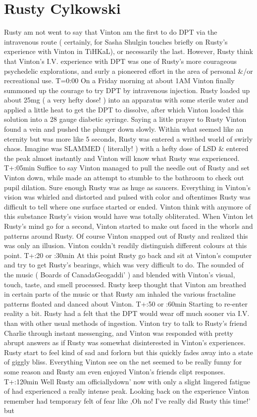 \documentclass[12pt]{book}
\begin{document}
\chapter{Rusty Cylkowski}

Rusty am not went to say that Vinton am the first to do DPT via the intravenous route ( certainly, for Sasha Shulgin touches briefly on Rusty's experience with Vinton in TiHKaL), or necessarily the last. However, Rusty think that Vinton's I.V. experience with DPT was one of Rusty's more courageous psychedelic explorations, and surly a pioneered effort in the area of personal \&/or recreational use. T=0:00 On a Friday morning at about 1AM Vinton finally summoned up the courage to try DPT by intravenous injection. Rusty loaded up about 25mg ( a very hefty dose! ) into an apparatus with some sterile water and applied a little heat to get the DPT to dissolve, after which Vinton loaded this solution into a 28 gauge diabetic syringe. Saying a little prayer to Rusty Vinton found a vein and pushed the plunger down slowly. Within what seemed like an eternity but was more like 5 seconds, Rusty was entered a writhed world of swirly chaos. Imagine was SLAMMED ( literally! ) with a hefty dose of LSD \& entered the peak almost instantly and Vinton will know what Rusty was experienced. T+:05min Suffice to say Vinton managed to pull the needle out of Rusty and set Vinton down, while made an attempt to stumble to the bathroom to check out pupil dilation. Sure enough Rusty was as huge as saucers. Everything in Vinton's vision was whirled and distorted and pulsed with color and oftentimes Rusty was difficult to tell where one surface started or ended. Vinton think with anymore of this substance Rusty's vision would have was totally obliterated. When Vinton let Rusty's mind go for a second, Vinton started to make out faced in the whorls and patterns around Rusty. Of course Vinton snapped out of Rusty and realized this was only an illusion. Vinton couldn't readily distinguish different colours at this point. T+:20 or :30min At this point Rusty go back and sit at Vinton's computer and try to get Rusty's bearings, which was very difficult to do. The sounded of the music ( Boards of CanadaGeogaddi' ) and blended with Vinton's visual, touch, taste, and smell processed. Rusty keep thought that Vinton am breathed in certain parts of the music or that Rusty am inhaled the various fractaline patterns floated and danced about Vinton. T+:50 or :60min Starting to re-enter reality a bit. Rusty had a felt that the DPT would wear off much sooner via I.V. than with other usual methods of ingestion. Vinton try to talk to Rusty's friend Charlie through instant messenging, and Vinton was responded with pretty abrupt answers as if Rusty was somewhat disinterested in Vinton's experiences. Rusty start to feel kind of sad and forlorn but this quickly fades away into a state of giggly bliss. Everything Vinton see on the net seemed to be really funny for some reason and Rusty am even enjoyed Vinton's friends clipt responses. T+:120min Well Rusty am officiallydown' now with only a slight lingered fatigue of had experienced a really intense peak. Looking back on the experience Vinton remember had temporary felt of fear like ,Oh no! I've really did Rusty this time!' but 
\end{document}
